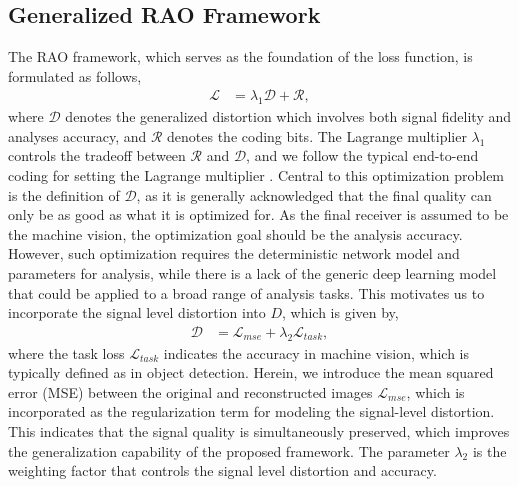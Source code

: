 \documentclass[transmag]{IEEEtran}
\begin{document}
\subsection{Generalized RAO Framework}
The RAO framework, which serves as the foundation of the loss function, is formulated as follows,
\begin{equation}
\begin{aligned}
\mathcal{L}&=\lambda_{1}\mathcal{D}+\mathcal{R}, 
\end{aligned}
\label{equ1}
\end{equation}
where \(\mathcal{D}\) denotes the generalized distortion which involves both signal fidelity and analyses accuracy, and \(\mathcal{R}\) denotes the coding bits. The Lagrange multiplier \(\lambda_1\) controls the tradeoff between
\(\mathcal{R}\) and \(\mathcal{D}\), and we follow the typical end-to-end coding for setting the Lagrange multiplier \cite{begaint2020compressai}. 
Central to this optimization problem is the definition of \(\mathcal{D}\), as it is generally acknowledged that the final 
quality can only be as good as what it is optimized for. As the final receiver is assumed to be the machine vision, the 
optimization goal should be the analysis accuracy. However, such optimization requires the deterministic network model and parameters for analysis, while there is a lack of the generic deep learning model that could be applied to a broad range of analysis tasks. This motivates us to incorporate the signal level distortion into \(D\), which is given by, 
\begin{equation}
\begin{aligned}
\mathcal{D}&=\mathcal{L}_{mse}+\lambda_{2}\mathcal{L}_{task},
\end{aligned}
\end{equation}
where the task loss $\mathcal{L}_{task}$ indicates the accuracy in machine vision, which is typically defined as \cite{ren2015faster} in object detection. 
Herein, we introduce the mean squared error (MSE) between the original and reconstructed images $\mathcal{L}_{mse}$, which is incorporated as the regularization term for modeling the signal-level distortion. This indicates that the signal quality is simultaneously preserved, which improves the generalization capability of the proposed framework. The parameter $\lambda_{2}$ is the weighting factor that controls the signal level distortion and accuracy.
\end{document}
